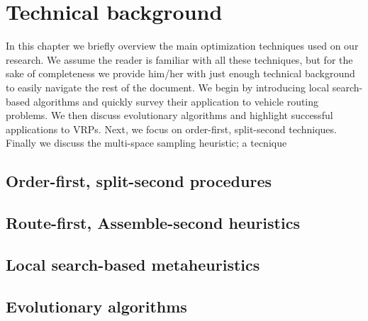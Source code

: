 \chapter{Technical background}
In this chapter we briefly overview the main optimization techniques used on our research. We assume the reader is familiar with all these techniques, but for the sake of completeness we provide him/her with just enough technical background to easily navigate the rest of the document. We begin by introducing local search-based algorithms and quickly survey their application to vehicle routing problems. We then discuss evolutionary algorithms and highlight successful applications to VRPs. Next, we focus on order-first, split-second techniques. Finally we discuss the multi-space sampling heuristic; a tecnique  

\section{Order-first, split-second procedures}

\section{Route-first, Assemble-second heuristics}

\section{Local search-based metaheuristics}

\section{Evolutionary algorithms}
